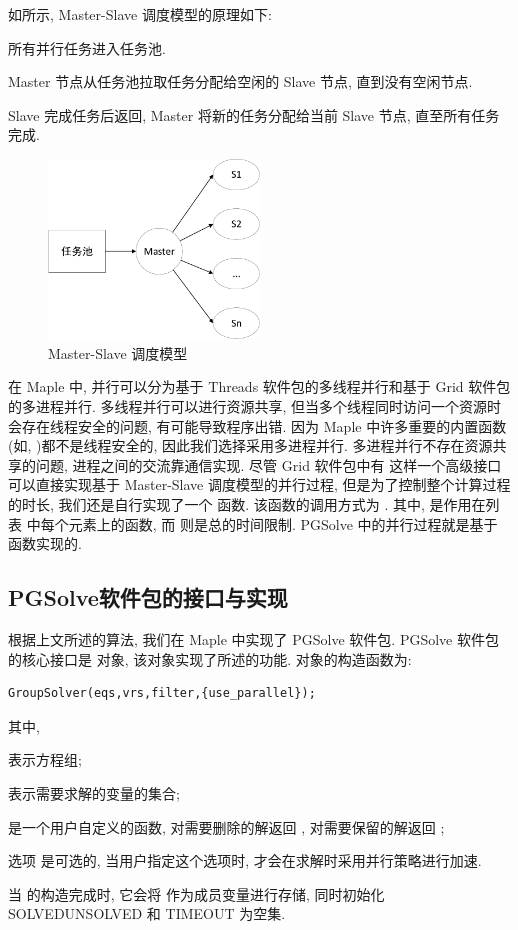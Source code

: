 如所示, Master-Slave 调度模型的原理如下:
\begin{compactenum}[Step 1.]
\item 所有并行任务进入任务池.
\item Master 节点从任务池拉取任务分配给空闲的 Slave 节点, 直到没有空闲节点.
\item Slave 完成任务后返回, Master 将新的任务分配给当前 Slave 节点, 直至所有任务完成. 
\end{compactenum}

\begin{figure}[htbp]
\centering 
\includegraphics[width=0.5\textwidth]{fig/msp.pdf}
\caption{Master-Slave 调度模型}\label{msp}
\end{figure}

在 Maple 中, 并行可以分为基于 Threads 软件包的多线程并行和基于 Grid 软件包的多进程并行. 多线程并行可以进行资源共享, 但当多个线程同时访问一个资源时会存在线程安全的问题, 有可能导致程序出错. 因为 Maple 中许多重要的内置函数(如, )都不是线程安全的, 因此我们选择采用多进程并行. 多进程并行不存在资源共享的问题, 进程之间的交流靠通信实现. 尽管 Grid 软件包中有  这样一个高级接口可以直接实现基于 Master-Slave 调度模型的并行过程, 但是为了控制整个计算过程的时长, 我们还是自行实现了一个  函数. 该函数的调用方式为 . 其中,  是作用在列表  中每个元素上的函数, 而  则是总的时间限制. PGSolve 中的并行过程就是基于  函数实现的. 

\subsection{PGSolve软件包的接口与实现}
根据上文所述的算法, 我们在 Maple 中实现了 PGSolve 软件包. PGSolve 软件包的核心接口是  对象, 该对象实现了所述的功能. 对象的构造函数为: 
\begin{verbatim}
GroupSolver(eqs,vrs,filter,{use_parallel});
\end{verbatim}
其中, 
\begin{compactitem}[\textbullet]
\item {} 表示方程组;
\item {} 表示需要求解的变量的集合;
\item {} 是一个用户自定义的函数, 对需要删除的解返回 , 对需要保留的解返回 ;
\item 选项  是可选的, 当用户指定这个选项时,  才会在求解时采用并行策略进行加速.
\end{compactitem}
当  的构造完成时, 它会将  作为成员变量进行存储, 同时初始化 SOLVED\D UNSOLVED 和 TIMEOUT 为空集. 

